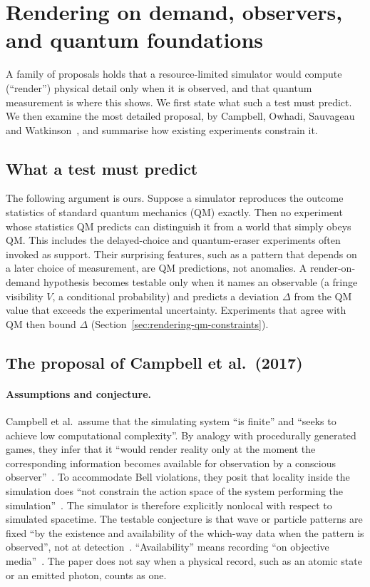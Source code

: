 \section{Rendering on demand, observers, and quantum foundations}
\label{sec:rendering-qm}

A family of proposals holds that a resource-limited simulator would compute
(``render'') physical detail only when it is observed, and that quantum
measurement is where this shows. We first state what such a test must predict.
We then examine the most detailed proposal, by Campbell, Owhadi, Sauvageau and
Watkinson~\cite{Campbell2017on}, and summarise how existing experiments
constrain it.

\subsection{What a test must predict}
\label{sec:rendering-qm-logic}

The following argument is ours. Suppose a simulator reproduces the outcome
statistics of standard quantum mechanics (QM) exactly. Then no experiment whose
statistics QM predicts can distinguish it from a world that simply obeys QM.
This includes the delayed-choice and quantum-eraser experiments often invoked
as support. Their surprising features, such as a pattern that depends on a later
choice of measurement, are QM predictions, not anomalies. A render-on-demand
hypothesis becomes testable only when it names an observable (a fringe
visibility $V$, a conditional probability) and predicts a deviation $\Delta$ from
the QM value that exceeds the experimental uncertainty. Experiments that agree
with QM then bound $\Delta$
(Section~\ref{sec:rendering-qm-constraints}).

\subsection{The proposal of Campbell et al.\ (2017)}
\label{sec:rendering-qm-campbell}

\paragraph{Assumptions and conjecture.}
Campbell et al.\ assume that the simulating system ``is finite'' and ``seeks to
achieve low computational complexity''. By analogy with procedurally generated
games, they infer that it ``would render reality only at the moment the
corresponding information becomes available for observation by a conscious
observer''~\cite[p.~80]{Campbell2017on}. To accommodate Bell violations, they
posit that locality inside the simulation does ``not constrain the action space
of the system performing the simulation''~\cite[p.~81]{Campbell2017on}. The
simulator is therefore explicitly nonlocal with respect to simulated
spacetime. The testable conjecture is that wave or particle patterns are fixed
``by the existence and availability of the which-way data when the pattern is
observed'', not at detection~\cite[p.~82]{Campbell2017on}. ``Availability'' means
recording ``on objective media''~\cite[p.~87]{Campbell2017on}. The paper does
not say when a physical record, such as an atomic state or an emitted photon,
counts as one.

